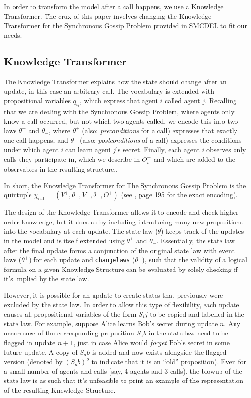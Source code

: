 In order to transform the model after a call happens, we use a Knowledge Transformer. The crux of this paper involves changing
the Knowledge Transformer for the Synchronous Gossip Problem provided in SMCDEL to fit our needs.

\subsection{Knowledge Transformer}
The Knowledge Transformer explains how the state should change after an update, in this case an arbitrary call.
The vocabulary is extended with propositional variables $q_{ij}$, which express that agent $i$ called agent $j$.
Recalling that we are dealing with the Synchronous Gossip Problem, where agents only know a call occurred,
but not which two agents called, we encode this into two laws $\theta^+$ and $\theta_-$, where $\theta^+$
(also: \textit{preconditions} for a call) expresses that exactly one
call happens, and $\theta_-$ (also: \textit{postconditions} of a call) expresses the conditions under which agent $i$ can
learn agent $j$'s secret.
Finally, each agent $i$ observes only calls they participate in,
which we describe in $O^+_i$ and which are added to the observables in the resulting structure..

In short, the Knowledge Transformer for The Synchronous Gossip Problem is the quintuple
$\chi_\text{call}=(V^+,\theta ^+,V_-,\theta _-,O^+)$ (see \cite{GattingerThesis2018}, page 195 for the exact encoding).

The design of the Knowledge Transformer allows it to encode and check higher-order knowledge, but it
does so by including introducing many new propositions into the vocabulary at each update.
The state law ($\theta$) keeps track of the updates in the model and is itself extended using $\theta^+$ and $\theta_-$.
Essentially, the state law
after the final update forms a conjunction of the original state law with event laws ($\theta^+$) for each update and
\texttt{changelaws} ($\theta_-$),
such that the validity of a logical formula on a given Knowledge Structure can be evaluated by solely checking if it's implied by
the state law.

However, it is possible for an update to create states that previously were excluded by the state law.
In order to allow this type of flexibility, each update causes all propositional variables of the form $S_ij$
to be copied and labelled in the state law. For example, suppose Alice learns Bob's secret during update $n$.
Any occurrence of the corresponding proposition $S_ab$ in the state law need to be flagged in update $n+1$, just in case
Alice would \textit{forget} Bob's secret in some future update. A copy of $S_ab$ is added and now exists alongside the
flagged version (denoted by $(S_ab)^o$ to indicate that it is an ``old'' proposition). Even for a small number of agents and
calls (say, 4 agents and 3 calls), the blowup of the state law is as such that it's unfeasible to print an example of the representation
of the resulting Knowledge Structure.

